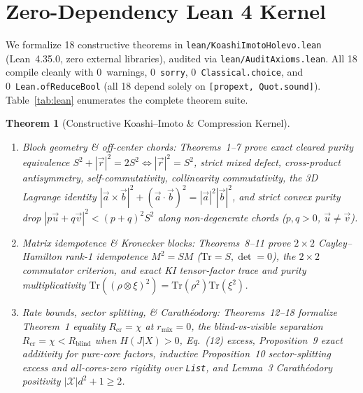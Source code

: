 \documentclass[11pt,twocolumn]{article}
\newtheorem{theorem}{Theorem}
\newcommand{\Tr}{\mathrm{Tr}}
\begin{document}
\section{Zero-Dependency Lean 4 Kernel}\label{sec:lean}
We formalize 18 constructive theorems in \texttt{lean/KoashiImotoHolevo.lean} (Lean~4.35.0, zero external libraries), audited via \texttt{lean/AuditAxioms.lean}. All 18 compile cleanly with 0~warnings, 0~\texttt{sorry}, 0~\texttt{Classical.choice}, and 0~\texttt{Lean.ofReduceBool} (all 18 depend solely on \texttt{[propext, Quot.sound]}). Table~\ref{tab:lean} enumerates the complete theorem suite.

\begin{theorem}[Constructive Koashi--Imoto \& Compression Kernel]\label{thm:lean}
\leavevmode
\begin{enumerate}[leftmargin=*,nosep]
  \item \emph{Bloch geometry \& off-center chords:} Theorems~1--7 prove exact cleared purity equivalence $S^2 + |\vec{r}|^2 = 2S^2 \iff |\vec{r}|^2 = S^2$, strict mixed defect, cross-product antisymmetry, self-commutativity, collinearity commutativity, the 3D Lagrange identity $|\vec{a}\times\vec{b}|^2 + (\vec{a}\cdot\vec{b})^2 = |\vec{a}|^2|\vec{b}|^2$, and strict convex purity drop $|p\vec{u}+q\vec{v}|^2 < (p+q)^2 S^2$ along non-degenerate chords ($p,q > 0$, $\vec{u}\neq\vec{v}$).
  \item \emph{Matrix idempotence \& Kronecker blocks:} Theorems~8--11 prove $2\times 2$ Cayley--Hamilton rank-1 idempotence $M^2 = SM$ ($\Tr=S, \det=0$), the $2\times 2$ commutator criterion, and exact KI tensor-factor trace and purity multiplicativity $\Tr((\rho\otimes\xi)^2) = \Tr(\rho^2)\Tr(\xi^2)$.
  \item \emph{Rate bounds, sector splitting, \& Carath\'eodory:} Theorems~12--18 formalize Theorem~1 equality $R_{\mathrm{cr}} = \chi$ at $r_{\mathrm{mix}} = 0$, the blind-vs-visible separation $R_{\mathrm{cr}} = \chi < R_{\mathrm{blind}}$ when $H(J|X)>0$, Eq.~(12) excess, Proposition~9 exact additivity for pure-core factors, inductive Proposition~10 sector-splitting excess and all-cores-zero rigidity over \texttt{List}, and Lemma~3 Carath\'eodory positivity $|\mathcal{X}|d^2 + 1 \ge 2$.
\end{enumerate}
\end{theorem}
\end{document}
